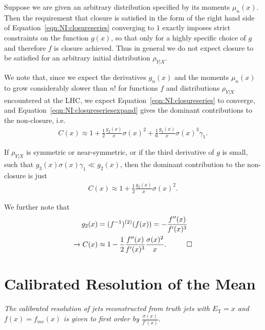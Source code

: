 Suppose we are given an arbitrary distribution specified by its moments $\mu_n(x)$. Then the requirement that closure is satisfied in the form of the right hand side of Equation~\ref{eqn:NI:closureseries} converging to $1$ exactly imposes strict constraints on the function $g(x)$, so that only for a highly specific choice of $g$ and therefore $f$ is closure achieved. Thus in general we do not expect closure to be satisfied for an arbitrary initial distribution $\rho_{Y|X}$.

We note that, since we expect the derivatives $g_n(x)$ and the moments $\mu_n(x)$ to grow considerably slower than $n!$ for functions $f$ and distributions $\rho_{Y|X}$ encountered at the LHC, we expect Equation~\ref{eqn:NI:closureseries} to converge, and Equation~\ref{eqn:NI:closureseriesexpand} gives the dominant contributions to the non-closure, i.e.
\begin{align}
  C(x) \approx 1+\frac{1}{2}\frac{g_2(x)}{x}\sigma(x)^2+\frac{1}{6}\frac{g_3(x)}{x}\sigma(x)^3\gamma_1.
\end{align}

If $\rho_{Y|X}$ is symmetric or near-symmetric, or if the third derivative of $g$ is small, such that $g_3(x)\sigma(x)\gamma_1 \ll g_2(x)$, then the dominant contribution to the non-closure is just
\begin{align}
  C(x) \approx 1+\frac{1}{2}\frac{g_2(x)}{x}\sigma(x)^2.
\end{align}

\noindent We further note that
\begin{align}
g_2(x) &= (f^{-1})^{(2)}(f(x)) = -\frac{f''(x)}{f'(x)^3}\nonumber\\
  \rightarrow C(x) &\approx 1-\frac{1}{2}\frac{f''(x)}{f'(x)^3}\frac{\sigma(x)^2}{x}.\hspace{1 cm}\Box
\label{eqn:NI:closureseriesgaussian}
\end{align}

\section{Calibrated Resolution of the Mean}
\label{sec:NI:calibrated_resolution_calculation}
{\it The calibrated resolution of jets reconstructed from truth jets with $E_\text{T} = x$ and $f(x)=f_{me}(x)$ is given to first order by $\frac{\sigma(x)}{f'(x)}$.}

\vspace{5mm}

